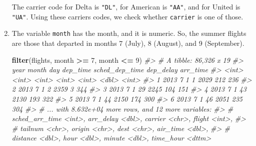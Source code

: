 \documentclass[]{book}
\newenvironment{Shaded}{\begin{snugshade}}{\end{snugshade}}
\newcommand{\CommentTok}[1]{\textcolor[rgb]{0.56,0.35,0.01}{\textit{#1}}}
\newcommand{\DecValTok}[1]{\textcolor[rgb]{0.00,0.00,0.81}{#1}}
\newcommand{\KeywordTok}[1]{\textcolor[rgb]{0.13,0.29,0.53}{\textbf{#1}}}
\newcommand{\NormalTok}[1]{#1}
\newcommand{\OperatorTok}[1]{\textcolor[rgb]{0.81,0.36,0.00}{\textbf{#1}}}
\newcommand{\StringTok}[1]{\textcolor[rgb]{0.31,0.60,0.02}{#1}}
\theoremstyle{plain}
\theoremstyle{remark}
\begin{document}
\begin{enumerate}
  The carrier code for Delta is \texttt{"DL"}, for American is \texttt{"AA"}, and for United is \texttt{"UA"}.
  Using these carriers codes, we check whether \texttt{carrier} is one of those.

\begin{Shaded}
\end{Shaded}
\item
  The variable \texttt{month} has the month, and it is numeric.
  So, the summer flights are those that departed in months 7 (July), 8 (August), and 9 (September).

\begin{Shaded}
\begin{Highlighting}[]
\KeywordTok{filter}\NormalTok{(flights, month }\OperatorTok{>=}\StringTok{ }\DecValTok{7}\NormalTok{, month }\OperatorTok{<=}\StringTok{ }\DecValTok{9}\NormalTok{)}
\CommentTok{#> # A tibble: 86,326 x 19}
\CommentTok{#>    year month   day dep_time sched_dep_time dep_delay arr_time}
\CommentTok{#>   <int> <int> <int>    <int>          <int>     <dbl>    <int>}
\CommentTok{#> 1  2013     7     1        1           2029       212      236}
\CommentTok{#> 2  2013     7     1        2           2359         3      344}
\CommentTok{#> 3  2013     7     1       29           2245       104      151}
\CommentTok{#> 4  2013     7     1       43           2130       193      322}
\CommentTok{#> 5  2013     7     1       44           2150       174      300}
\CommentTok{#> 6  2013     7     1       46           2051       235      304}
\CommentTok{#> # ... with 8.632e+04 more rows, and 12 more variables:}
\CommentTok{#> #   sched_arr_time <int>, arr_delay <dbl>, carrier <chr>, flight <int>,}
\CommentTok{#> #   tailnum <chr>, origin <chr>, dest <chr>, air_time <dbl>,}
\CommentTok{#> #   distance <dbl>, hour <dbl>, minute <dbl>, time_hour <dttm>}
\end{Highlighting}
\end{Shaded}


\end{enumerate}
\end{document}
